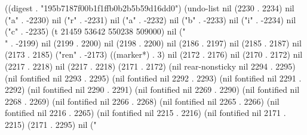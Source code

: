 
((digest . "195b7187f00b1f1ffb0b2b5b59d16dd0") (undo-list nil (2230 . 2234) nil ("a" . -2230) nil ("r" . -2231) nil ("a" . -2232) nil ("b" . -2233) nil ("i" . -2234) nil ("c" . -2235) (t 21459 53642 550238 509000) nil ("\\" . -2199) nil (2199 . 2200) nil (2198 . 2200) nil (2186 . 2197) nil (2185 . 2187) nil (2173 . 2185) ("ren" . -2173) ((marker*) . 3) nil (2172 . 2176) nil (2170 . 2172) nil (2217 . 2218) nil (2217 . 2218) (2171 . 2172) (nil rear-nonsticky nil 2294 . 2295) (nil fontified nil 2293 . 2295) (nil fontified nil 2292 . 2293) (nil fontified nil 2291 . 2292) (nil fontified nil 2290 . 2291) (nil fontified nil 2269 . 2290) (nil fontified nil 2268 . 2269) (nil fontified nil 2266 . 2268) (nil fontified nil 2265 . 2266) (nil fontified nil 2216 . 2265) (nil fontified nil 2215 . 2216) (nil fontified nil 2171 . 2215) (2171 . 2295) nil ("
